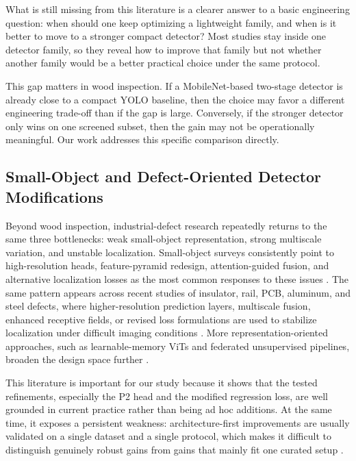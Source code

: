 What is still missing from this literature is a clearer answer to a basic engineering question: when should one keep optimizing a lightweight family, and when is it better to move to a stronger compact detector? Most studies stay inside one detector family, so they reveal how to improve that family but not whether another family would be a better practical choice under the same protocol.

This gap matters in wood inspection. If a MobileNet-based two-stage detector is already close to a compact YOLO baseline, then the choice may favor a different engineering trade-off than if the gap is large. Conversely, if the stronger detector only wins on one screened subset, then the gain may not be operationally meaningful. Our work addresses this specific comparison directly.

\subsection{Small-Object and Defect-Oriented Detector Modifications}

Beyond wood inspection, industrial-defect research repeatedly returns to the same three bottlenecks: weak small-object representation, strong multiscale variation, and unstable localization. Small-object surveys consistently point to high-resolution heads, feature-pyramid redesign, attention-guided fusion, and alternative localization losses as the most common responses to these issues \citep{wei_2024_smallreview,hua_2025_smallsurvey}. The same pattern appears across recent studies of insulator, rail, PCB, aluminum, and steel defects, where higher-resolution prediction layers, multiscale fusion, enhanced receptive fields, or revised loss formulations are used to stabilize localization under difficult imaging conditions \citep{cmc_insulator_small,cmc_yolovsi,cmc_cg_yolov8,cmc_pcb_yolov8,cmc_aluminum_yolov8n,cmc_msese}. More representation-oriented approaches, such as learnable-memory ViTs and federated unsupervised pipelines, broaden the design space further \citep{cmc_lmvit,cmc_flame}.

This literature is important for our study because it shows that the tested refinements, especially the P2 head and the modified regression loss, are well grounded in current practice rather than being ad hoc additions. At the same time, it exposes a persistent weakness: architecture-first improvements are usually validated on a single dataset and a single protocol, which makes it difficult to distinguish genuinely robust gains from gains that mainly fit one curated setup \citep{bpn_yolo,sim_yolo,fdd_yolo,an_cwb_yolov8}.


